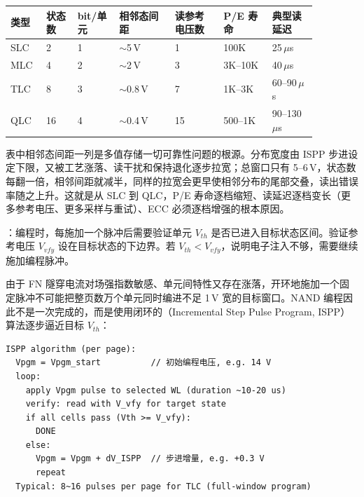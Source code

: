 \begin{longtable}{L{0.09\linewidth}L{0.09\linewidth}L{0.12\linewidth}L{0.16\linewidth}L{0.14\linewidth}L{0.14\linewidth}L{0.13\linewidth}}
\toprule
类型 & 状态数 & bit/单元 & 相邻态间距 & 读参考电压数 & P/E 寿命 & 典型读延迟 \\
\midrule
SLC & 2 & 1 & $\sim$5\,V & 1 & 100K & 25\,$\mu$s \\
MLC & 4 & 2 & $\sim$2\,V & 3 & 3K--10K & 40\,$\mu$s \\
TLC & 8 & 3 & $\sim$0.8\,V & 7 & 1K--3K & 60--90\,$\mu$s \\
QLC & 16 & 4 & $\sim$0.4\,V & 15 & 500--1K & 90--130\,$\mu$s \\
\bottomrule
\end{longtable}

表中相邻态间距一列是多值存储一切可靠性问题的根源。分布宽度由 ISPP 步进设定下限，又被工艺涨落、读干扰和保持退化逐步拉宽；总窗口只有 5--6\,V，状态数每翻一倍，相邻间距就减半，同样的拉宽会更早使相邻分布的尾部交叠，读出错误率随之上升。这就是从 SLC 到 QLC，P/E 寿命逐档缩短、读延迟逐档变长（更多参考电压、更多采样与重试）、ECC 必须逐档增强的根本原因。

：编程时，每施加一个脉冲后需要验证单元 $V_{th}$ 是否已进入目标状态区间。验证参考电压 $V_{vfy}$ 设在目标状态的下边界。若 $V_{th} < V_{vfy}$，说明电子注入不够，需要继续施加编程脉冲。


由于 FN 隧穿电流对场强指数敏感、单元间特性又存在涨落，开环地施加一个固定脉冲不可能把整页数万个单元同时编进不足 1\,V 宽的目标窗口。NAND 编程因此不是一次完成的，而是使用闭环的（Incremental Step Pulse Program, ISPP）算法逐步逼近目标 $V_{th}$：

\begin{lstlisting}
ISPP algorithm (per page):
  Vpgm = Vpgm_start          // 初始编程电压, e.g. 14 V
  loop:
    apply Vpgm pulse to selected WL (duration ~10-20 us)
    verify: read with V_vfy for target state
    if all cells pass (Vth >= V_vfy):
      DONE
    else:
      Vpgm = Vpgm + dV_ISPP  // 步进增量, e.g. +0.3 V
      repeat
  Typical: 8~16 pulses per page for TLC (full-window program)
\end{lstlisting}


